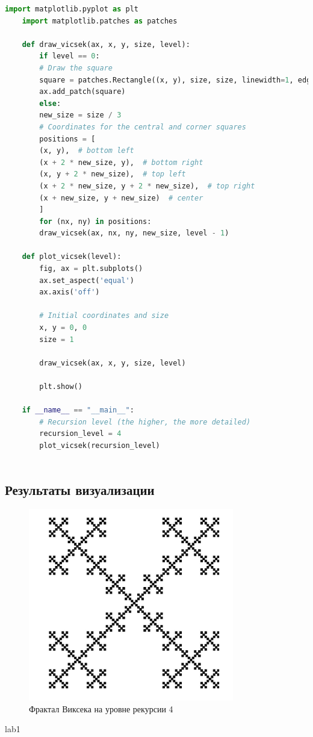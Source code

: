 \documentclass{article}
\begin{document}
\begin{lstlisting}[language=Python, inputencoding=utf8]
	import matplotlib.pyplot as plt
	import matplotlib.patches as patches
	
	def draw_vicsek(ax, x, y, size, level):
		if level == 0:
		# Draw the square
		square = patches.Rectangle((x, y), size, size, linewidth=1, edgecolor='black', 	facecolor='black')
		ax.add_patch(square)
		else:
		new_size = size / 3
		# Coordinates for the central and corner squares
		positions = [
		(x, y),  # bottom left
		(x + 2 * new_size, y),  # bottom right
		(x, y + 2 * new_size),  # top left
		(x + 2 * new_size, y + 2 * new_size),  # top right
		(x + new_size, y + new_size)  # center
		]
		for (nx, ny) in positions:
		draw_vicsek(ax, nx, ny, new_size, level - 1)
	
	def plot_vicsek(level):
		fig, ax = plt.subplots()
		ax.set_aspect('equal')
		ax.axis('off')
		
		# Initial coordinates and size
		x, y = 0, 0
		size = 1
	
		draw_vicsek(ax, x, y, size, level)
	
		plt.show()
	
	if __name__ == "__main__":
		# Recursion level (the higher, the more detailed)
		recursion_level = 4
		plot_vicsek(recursion_level)
	
\end{lstlisting}
	
	\subsection{Результаты визуализации}
	\begin{figure}[H]
		\centering
		\includegraphics[width=0.8\textwidth]{images/screenshot_vicsek}
		\caption{Фрактал Виксека на уровне рекурсии 4}
		\label{fig}
	\end{figure}
	lab1
	\newpage
	
\end{document}
